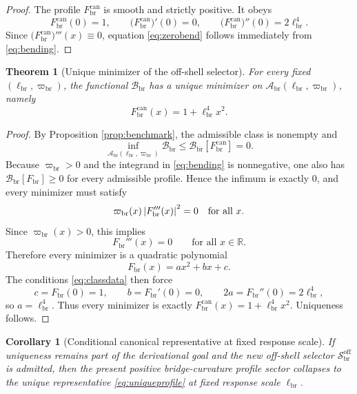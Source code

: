 \documentclass[11pt]{article}
\newcommand{\CurvScale}{\ell_{\mathrm{br}}}
\newcommand{\CurvProfile}{F_{\mathrm{br}}}
\newcommand{\CurvProfileCan}{F_{\mathrm{br}}^{\mathrm{can}}}
\newcommand{\ProfWeight}{\varpi_{\mathrm{br}}}
\newcommand{\ProfClass}{\mathscr A_{\mathrm{br}}}
\newcommand{\ProfBend}{\mathscr B_{\mathrm{br}}}
\newcommand{\ProfRule}{\mathscr S_{\mathrm{br}}^{\mathrm{off}}}
\newtheorem{corollary}{Corollary}
\newtheorem{theorem}{Theorem}
\begin{document}
\begin{proof}
The profile \(\CurvProfileCan\) is smooth and strictly positive. It obeys
\[
\CurvProfileCan(0)=1,
\qquad
\bigl(\CurvProfileCan\bigr)'(0)=0,
\qquad
\bigl(\CurvProfileCan\bigr)''(0)=2\CurvScale^4.
\]
Since \(\bigl(\CurvProfileCan\bigr)'''(x)\equiv0\), equation \eqref{eq:zerobend} follows immediately from \eqref{eq:bending}.
\end{proof}

\begin{theorem}[Unique minimizer of the off-shell selector]
\label{thm:unique}
For every fixed \((\CurvScale,\ProfWeight)\), the functional \(\ProfBend\) has a unique minimizer on \(\ProfClass(\CurvScale,\ProfWeight)\), namely
\begin{equation}
\CurvProfileCan(x)=1+\CurvScale^4x^2.
\label{eq:uniqueprofile}
\end{equation}
\end{theorem}

\begin{proof}
By Proposition \ref{prop:benchmark}, the admissible class is nonempty and
\[
\inf_{\ProfClass(\CurvScale,\ProfWeight)}\ProfBend \leq \ProfBend[\CurvProfileCan]=0.
\]
Because \(\ProfWeight>0\) and the integrand in \eqref{eq:bending} is nonnegative, one also has \(\ProfBend[\CurvProfile]\geq0\) for every admissible profile. Hence the infimum is exactly \(0\), and every minimizer must satisfy
\[
\ProfWeight(x)\,\abs{\CurvProfile'''(x)}^2=0
\quad\text{for all }x.
\]
Since \(\ProfWeight(x)>0\), this implies
\begin{equation}
\CurvProfile'''(x)=0
\qquad
\text{for all }x\in\mathbb R.
\label{eq:thirdzero}
\end{equation}
Therefore every minimizer is a quadratic polynomial
\begin{equation}
\CurvProfile(x)=ax^2+bx+c.
\label{eq:quadratic}
\end{equation}
The conditions \eqref{eq:classdata} then force
\[
c=\CurvProfile(0)=1,
\qquad
b=\CurvProfile'(0)=0,
\qquad
2a=\CurvProfile''(0)=2\CurvScale^4,
\]
so \(a=\CurvScale^4\). Thus every minimizer is exactly \(\CurvProfileCan(x)=1+\CurvScale^4x^2\). Uniqueness follows.
\end{proof}

\begin{corollary}[Conditional canonical representative at fixed response scale]
\label{cor:conditional}
If uniqueness remains part of the derivational goal and the new off-shell selector \(\ProfRule\) is admitted, then the present positive bridge-curvature profile sector collapses to the unique representative \eqref{eq:uniqueprofile} at fixed response scale \(\CurvScale\).
\end{corollary}
\end{document}
